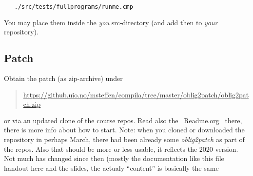 \documentclass[11pt,freeform]{handout}[2014/08/13]
\begin{document}
\begin{verbatim}
   ./src/tests/fullprograms/runme.cmp
\end{verbatim}


You may place them inside the \emph{you} src-directory (and add then to
\emph{your} repository).

\subsection*{Patch}
\label{sec:patch}


Obtain the patch (as zip-archive) under 

\begin{quote}
  \url{https://github.uio.no/msteffen/compila/tree/master/oblig2patch/oblig2patch.zip}
\end{quote}

or via an updated clone of the course repos. Read also the ~Readme.org~
there, there is more info about how to start. Note: when you cloned or
downloaded the repository in perhaps March, there had been already some
\emph{oblig2patch} as part of the repos. Also that should be more or less
usable, it reflects the 2020 version. Not much has changed since then
(mostly the documentation like this file handout here and the slides, the
actualy ``content'' is basically the same




%
% 




\end{document}

